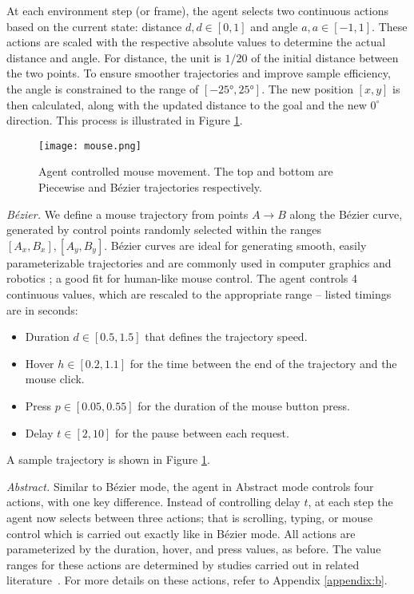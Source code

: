 At each environment step (or frame), the agent selects two continuous actions based on the current state: distance $d, d \in [0,1]$ and angle $a, a \in [-1,1]$.
These actions are scaled with the respective absolute values to determine the actual distance and angle.
For distance, the unit is $1/20$ of the initial distance between the two points.
To ensure smoother trajectories and improve sample efficiency, the angle is constrained to the range of $[\ang{-25}, \ang{25}]$.
The new position $[x,y]$ is then calculated, along with the updated distance to the goal and the new $0^{\circ}$ direction.
This process is illustrated in Figure \ref{mouse}.

\begin{figure}
\centerline{\texttt{[image: mouse.png]}}
\caption[Agent controlled mouse movement.]{Agent controlled mouse movement. The top and bottom are Piecewise and Bézier trajectories respectively.}
\label{mouse}
\end{figure}

\emph{Bézier.} We define a mouse trajectory from points $A \rightarrow B$ along the Bézier curve, generated by control points randomly selected within the ranges  $[A_x,B_x], [A_y,B_y]$.
Bézier curves are ideal for generating smooth, easily parameterizable trajectories and are commonly used in computer graphics and robotics \cite{tharwat2019intelligent, wang2020using}; a good fit for human-like mouse control.
The agent controls 4 continuous values, which are rescaled to the appropriate range -- listed timings are in seconds:
\begin{itemize}
  \item Duration $d \in [0.5,1.5]$ that defines the trajectory speed.
  \item Hover $h \in [0.2,1.1]$ for the time between the end of the trajectory and the mouse click.
  \item Press $p \in [0.05,0.55]$ for the duration of the mouse button press.
  \item Delay $t \in [2,10]$ for the pause between each request.
\end{itemize}
A sample trajectory is shown in Figure \ref{mouse}.

\emph{Abstract.} Similar to Bézier mode, the agent in Abstract mode controls four actions, with one key difference.
Instead of controlling delay $t$, at each step the agent now selects between three actions; that is scrolling, typing, or mouse control which is carried out exactly like in Bézier mode.
All actions are parameterized by the duration, hover, and press values, as before.
The value ranges for these actions are determined by studies carried out in related literature~\cite{dhakal2018observations, katerina2018mouse}.
For more details on these actions, refer to Appendix \ref{appendix:b}.

